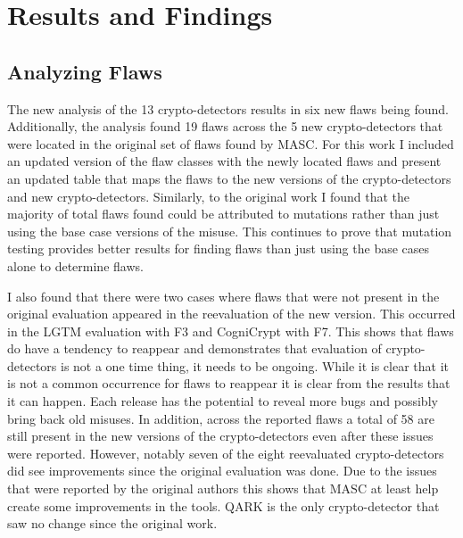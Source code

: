 \chapter{Results and Findings}
\label{chap_results}

\section{Analyzing Flaws}
\label{ch5:sec:flaws}

\begin{sloppypar}
%
\end{sloppypar}


The new analysis of the 13 crypto-detectors results in six new flaws being found. Additionally, the analysis found 19 flaws across the 5 new crypto-detectors that were located in the original set of flaws found by MASC. For this work I included an updated version of the flaw classes with the newly located flaws and present an updated table that maps the flaws to the new versions of the crypto-detectors and new crypto-detectors. Similarly, to the original work I found that the majority of total flaws found could be attributed to mutations rather than just using the base case versions of the misuse. This continues to prove that mutation testing provides better results for finding flaws than just using the base cases alone to determine flaws.

I also found that there were two cases where flaws that were not present in the original evaluation appeared in the reevaluation of the new version. This occurred in the LGTM evaluation with F3 and CogniCrypt with F7.  This shows that flaws do have a tendency to reappear and demonstrates that evaluation of crypto-detectors is not a one time thing, it needs to be ongoing. While it is clear that it is not a common occurrence for flaws to reappear it is clear from the results that it can happen. Each release has the potential to reveal more bugs and possibly bring back old misuses. In addition, across the reported flaws a total of 58 are still present in the new versions of the crypto-detectors even after these issues were reported. However, notably seven of the eight reevaluated crypto-detectors did see improvements since the original evaluation was done. Due to the issues that were reported by the original authors this shows that MASC at least help create some improvements in the tools. QARK is the only crypto-detector that saw no change since the original work.

